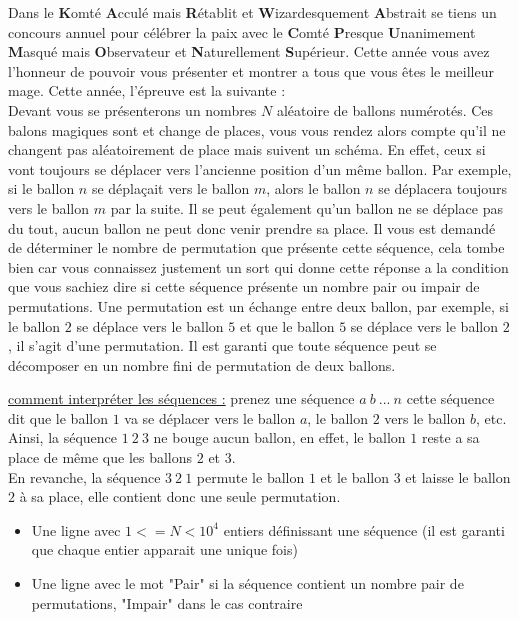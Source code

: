 \problemname{\problemyamlname}


Dans le \textbf{K}omté \textbf{A}cculé mais \textbf{R}établit et \textbf{W}izardesquement \textbf{A}bstrait se tiens un concours annuel pour célébrer la paix avec le \textbf{C}omté \textbf{P}resque \textbf{U}nanimement \textbf{M}asqué mais \textbf{O}bservateur et \textbf{N}aturellement \textbf{S}upérieur.
Cette année vous avez l'honneur de pouvoir vous présenter et montrer a tous que vous êtes le meilleur mage. Cette année, l'épreuve est la suivante : \\

Devant vous se présenterons un nombres $N$ aléatoire de ballons numérotés. Ces balons magiques sont et change de places, vous vous rendez alors compte qu'il ne changent pas aléatoirement de place mais suivent un schéma. En effet, ceux si vont toujours se déplacer vers l'ancienne position d'un même ballon.
Par exemple, si le ballon $n$ se déplaçait vers le ballon $m$, alors le ballon $n$ se déplacera toujours vers le ballon $m$ par la suite. Il se peut également qu'un ballon ne se déplace pas du tout, aucun ballon ne peut donc venir prendre sa place.
Il vous est demandé de déterminer le nombre de permutation que présente cette séquence, cela tombe bien car vous connaissez justement un sort qui donne cette réponse a la condition que vous sachiez dire si cette séquence présente un nombre pair ou impair de permutations.
Une permutation est un échange entre deux ballon, par exemple, si le ballon $2$ se déplace vers le ballon $5$ et que le ballon $5$ se déplace vers le ballon $2$, il s'agit d'une permutation.
Il est garanti que toute séquence peut se décomposer en un nombre fini de permutation de deux ballons.

\underline{comment interpréter les séquences :} prenez une séquence $a\ b\ ...\ n$ cette séquence dit que le ballon $1$ va se déplacer vers le ballon $a$, le ballon $2$ vers le ballon $b$, etc.\\
Ainsi, la séquence $1\ 2\ 3$ ne bouge aucun ballon, en effet, le ballon $1$ reste a sa place de même que les ballons $2$ et $3$.\\
En revanche, la séquence $3\ 2\ 1$ permute le ballon $1$ et le ballon $3$ et laisse le ballon $2$ à sa place, elle contient donc une seule permutation.

\begin{Input}
    \begin{itemize}
        \item Une ligne avec $1 <= N < 10^4$ entiers définissant une séquence (il est garanti que chaque entier apparait une unique fois)
    \end{itemize}
\end{Input}

\begin{Output}
    \begin{itemize}
        \item Une ligne avec le mot "Pair" si la séquence contient un nombre pair de permutations, "Impair" dans le cas contraire
    \end{itemize}
\end{Output}